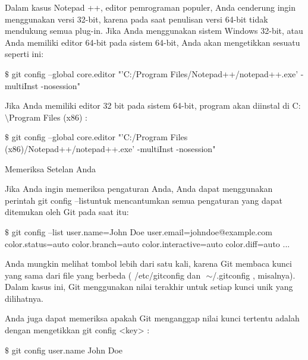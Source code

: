 \noindent 
Dalam kasus Notepad ++, editor pemrograman populer, Anda cenderung ingin menggunakan versi 32-bit, karena pada saat penulisan versi 64-bit tidak mendukung semua plug-in. $  $Jika Anda menggunakan sistem Windows 32-bit, atau Anda memiliki editor 64-bit pada sistem 64-bit, Anda akan mengetikkan sesuatu seperti ini: \par
\vspace{12pt}
\noindent 
  $  \$  $ git config --global core.editor "'C:/Program Files/Notepad++/notepad++.exe' -multiInst -nosession"  \par
\vspace{12pt}
\noindent 
Jika Anda memiliki editor 32 bit pada sistem 64-bit, program akan diinstal di $  $C: $  \setminus  $Program Files (x86) $  $: \par
\vspace{12pt}
\noindent 
  $  \$  $ git config --global core.editor "'C:/Program Files (x86)/Notepad++/notepad++.exe' -multiInst -nosession"  \par
\noindent 
Memeriksa Setelan Anda \par
\vspace{12pt}
\noindent 
Jika Anda ingin memeriksa pengaturan Anda, Anda dapat menggunakan perintah $  $git config --listuntuk mencantumkan semua pengaturan yang dapat ditemukan oleh Git pada saat itu: \par
\vspace{12pt}
\noindent 
  $  \$  $ git config --list user.name=John Doe user.email=johndoe@example.com color.status=auto color.branch=auto color.interactive=auto color.diff=auto ...  \par
\vspace{12pt}
\noindent 
Anda mungkin melihat tombol lebih dari satu kali, karena Git membaca kunci yang sama dari file yang berbeda ( $  $/etc/gitconfig $  $dan $  $ $  \sim  $/.gitconfig $  $, misalnya). $  $Dalam kasus ini, Git menggunakan nilai terakhir untuk setiap kunci unik yang dilihatnya. \par
\vspace{12pt}
\noindent 
Anda juga dapat memeriksa apakah Git menganggap nilai kunci tertentu adalah dengan mengetikkan $  $git config <key> $  $: \par
\vspace{12pt}
\noindent 
  $  \$  $ git config user.name John Doe  \par
\vspace{12pt}
\vspace{12pt}
\vspace{12pt}

